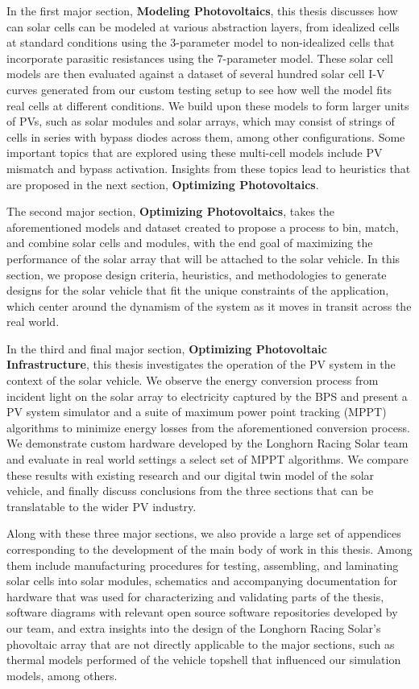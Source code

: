 In the first major section, \textbf{Modeling Photovoltaics}, this thesis
discusses how can solar cells can be modeled at various abstraction layers, from
idealized cells at standard conditions using the 3-parameter model to
non-idealized cells that incorporate parasitic resistances using the 7-parameter
model. These solar cell models are then evaluated against a dataset of several
hundred solar cell \ac{I-V} curves generated from our custom testing setup to
see how well the model fits real cells at different conditions. We build upon
these models to form larger units of \ac{PV}s, such as solar modules and solar
arrays, which may consist of strings of cells in series with bypass diodes
across them, among other configurations. Some important topics that are explored
using these multi-cell models include \ac{PV} mismatch and bypass activation.
Insights from these topics lead to heuristics that are proposed in the next
section, \textbf{Optimizing Photovoltaics}.

The second major section, \textbf{Optimizing Photovoltaics}, takes the
aforementioned models and dataset created to propose a process to bin, match,
and combine solar cells and modules, with the end goal of maximizing the
performance of the solar array that will be attached to the solar vehicle. In
this section, we propose design criteria, heuristics, and methodologies to
generate designs for the solar vehicle that fit the unique constraints of the
application, which center around the dynamism of the system as it moves in
transit across the real world.

In the third and final major section, \textbf{Optimizing Photovoltaic
Infrastructure}, this thesis investigates the operation of the \ac{PV}
system in the context of the solar vehicle. We observe the energy conversion
process from incident light on the solar array to electricity captured by the
\ac{BPS} and present a \ac{PV} system simulator and a suite of maximum power
point tracking (MPPT) algorithms to minimize energy losses from the
aforementioned conversion process. We demonstrate custom hardware developed by the
Longhorn Racing Solar team and evaluate in real world settings a select set of
MPPT algorithms. We compare these results with existing research and our digital
twin model of the solar vehicle, and finally discuss conclusions from the three
sections that can be translatable to the wider \ac{PV} industry.

Along with these three major sections, we also provide a large set of appendices
corresponding to the development of the main body of work in this thesis. Among
them include manufacturing procedures for testing, assembling, and laminating
solar cells into solar modules, schematics and accompanying documentation for
hardware that was used for characterizing and validating parts of the thesis,
software diagrams with relevant open source software repositories developed by
our team, and extra insights into the design of the Longhorn Racing Solar's
phovoltaic array that are not directly applicable to the major sections, such as
thermal models performed of the vehicle topshell that influenced our simulation
models, among others.